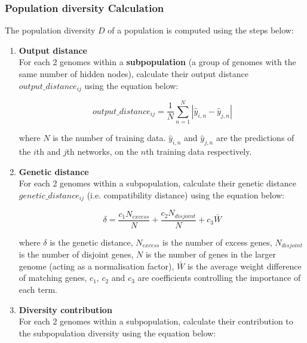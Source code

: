 \subsubsection{Population diversity Calculation}
\label{subsubsec:neat_ncl_population_diversity}
The population diversity $D$ of a population is computed using the steps below: 
\begin{enumerate}
    \item \textbf{Output distance} \\
    For each 2 genomes within a \textbf{subpopulation} (a group of genomes with the same number of hidden nodes), calculate their output distance $output\_distance_{ij}$ using the equation below: 

    \begin{equation}
        \label{equation:neat_ncl_output_distance}
        output\_distance_{ij} = \frac{1}{N} \sum_{n = 1}^N \left| \hat{y}_{i,n} - \hat{y}_{j,n} \right|
    \end{equation}

    where $N$ is the number of training data. $\hat{y}_{i,n}$ and $\hat{y}_{j,n}$ are the predictions of the $i$th and $j$th networks, on the $n$th training data respectively. 

    \item \textbf{Genetic distance} \\
    For each 2 genomes within a subpopulation, calculate their genetic distance $genetic\_distance_{ij}$ (i.e. compatibility distance) using the equation below: 

    \begin{equation}
        \label{equation:neat_ncl_genetic_distance}
        \delta = \frac{c_1 N_{excess}}{N} + \frac{c_2 N_{disjoint}}{N} + c_3 \bar{W}
    \end{equation}

    where $\delta$ is the genetic distance, $N_{excess}$ is the number of excess genes, $N_{disjoint}$ is the number of disjoint genes, $N$ is the number of genes in the larger genome (acting as a normalisation factor), $\bar{W}$ is the average weight difference of matching genes, $c_1$, $c_2$ and $c_3$ are coefficients controlling the importance of each term. 

    \item \textbf{Diversity contribution} \\
    For each 2 genomes within a subpopulation, calculate their contribution to the subpopulation diversity using the equation below: 


\end{enumerate}
